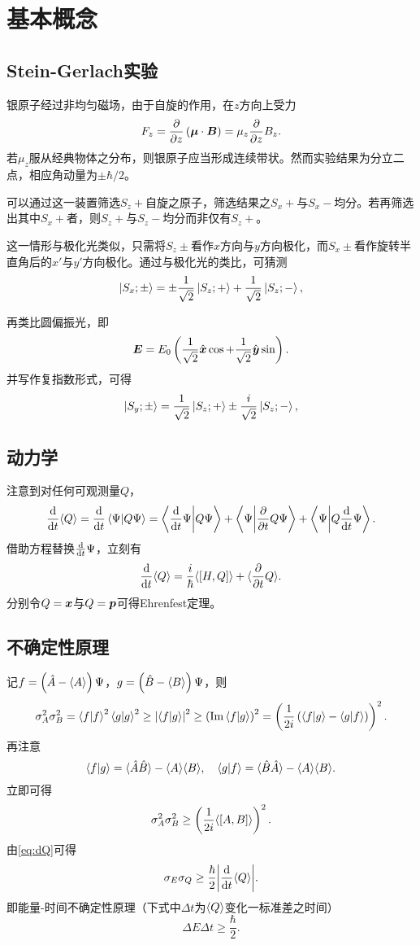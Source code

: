 \documentclass{ctexart}
\begin{document}
\section{基本概念}
\subsection{Stein-Gerlach实验}
银原子经过非均匀磁场，由于自旋的作用，在$z$方向上受力
\[ F_z =  \frac{\partial}{\partial z}\left(\boldsymbol{\mu}\cdot\boldsymbol{B}\right) = \mu_z \frac{\partial}{\partial z}B_z. \]
若$\mu_z$服从经典物体之分布，则银原子应当形成连续带状。然而实验结果为分立二点，相应角动量为$\pm \hbar /2$。
\par
可以通过这一装置筛选$S_z+$自旋之原子，筛选结果之$S_x+$与$S_x-$均分。若再筛选出其中$S_x+$者，则$S_z+$与$S_z-$均分而非仅有$S_z+$。
\par
这一情形与极化光类似，只需将$S_z\pm$看作$x$方向与$y$方向极化，而$S_x\pm$看作旋转半直角后的$x'$与$y'$方向极化。通过与极化光的类比，可猜测
\[ \ket{S_x;\pm} = \pm\frac{1}{\sqrt{2}}\ket{S_z;+} + \frac{1}{\sqrt{2}}\ket{S_z;-}, \]
\par
再类比圆偏振光，即
\[ \boldsymbol{E} = E_0\left(\frac{1}{\sqrt{2}} \hat{\boldsymbol{x}} \cos + \frac{1}{\sqrt{2}} \hat{\boldsymbol{y}} \sin\right). \]
并写作复指数形式，可得
\[ \ket{S_y;\pm} = \frac{1}{\sqrt{2}}\ket{S_z;+} \pm  \frac{i}{\sqrt{2}}\ket{S_z;-}, \]
\subsection{动力学}
注意到对任何可观测量$Q$，
\[ \frac{\mathrm{d}}{\mathrm{d} t}\langle Q\rangle = \frac{\mathrm{d}}{\mathrm{d} t}\bra{\Psi}\ket{Q\Psi} = \bra{\frac{\mathrm{d}}{\mathrm{d} t}\Psi}\ket{Q\Psi} + \bra{\Psi}\ket{\frac{\partial}{\partial t}{Q}\Psi} + \bra{\Psi}\ket{Q\frac{\mathrm{d}}{\mathrm{d} t}\Psi}. \]
借助\sch 方程替换$\frac{\mathrm{d}}{\mathrm{d} t}\Psi$，立刻有
\begin{equation}
\label{eq:dQ}
\frac{\mathrm{d}}{\mathrm{d} t}\langle Q\rangle = \frac{i}{\hbar}\langle\left[H, Q\right]\rangle + \langle\frac{\partial}{\partial t}{Q}\rangle.
\end{equation}
分别令$Q=\boldsymbol{x}$与$Q=\boldsymbol{p}$可得Ehrenfest定理。
\subsection{不确定性原理}
记$f=\left(\hat{A} - \langle A\rangle\right)\Psi$，$g=\left(\hat{B} - \langle B\rangle\right)\Psi$，则
\[ \sigma_{A}^2\sigma_{B}^2 = \bra{f}\ket{f}^2\bra{g}\ket{g}^2 \ge \abs{\bra{f}\ket{g}}^2 \ge \left(\Im\bra{f}\ket{g}\right)^2 = \left(\frac{1}{2i}\left(\bra{f}\ket{g}-\bra{g}\ket{f}\right)\right)^2. \]
再注意
\[ \bra{f}\ket{g} = \langle\hat{A}\hat{B}\rangle - \langle A\rangle\langle B\rangle,\quad \bra{g}\ket{f} = \langle\hat{B}\hat{A}\rangle - \langle A\rangle\langle B\rangle. \]
立即可得
\[ \sigma_{A}^2\sigma_{B}^2 \ge \left(\frac{1}{2i}\langle\left[A, B\right]\rangle\right)^2. \]
由\eqref{eq:dQ}可得
\[ \sigma_{E}\sigma_{Q} \ge \frac{\hbar}{2}\abs{\frac{\mathrm{d}}{\mathrm{d} t}\langle Q\rangle}. \]
即能量-时间不确定性原理（下式中$\Delta t$为$\langle Q\rangle$变化一标准差之时间）
\[ \Delta E \Delta t \ge \frac{\hbar}{2}. \]
\end{document}
